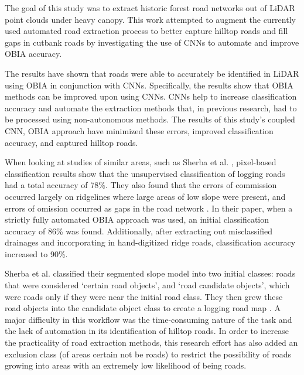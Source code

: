 \documentclass[remotesensing,article,accept,pdftex,moreauthors]{Definitions/mdpi}
\begin{document}
The goal of this study was to extract historic forest road networks out of LiDAR point clouds under heavy canopy. This work attempted to augment the currently used automated road extraction process to better capture hilltop roads and fill gaps in cutbank roads by investigating the use of CNNs to automate and improve OBIA accuracy.

The results have shown that roads were able to accurately be identified in LiDAR using OBIA in conjunction with CNNs. Specifically, the results show that OBIA methods can be improved upon using CNNs. CNNs help to increase classification accuracy and automate the extraction methods that, in previous research, had to be processed using non-autonomous methods. The results of this study’s coupled CNN, OBIA approach have minimized these errors, improved classification accuracy, and captured hilltop roads.

When looking at studies of similar areas, such as Sherba et al. \cite{sherba}, %
 pixel-based classification results show that the unsupervised classification of logging roads had a total accuracy of 78\%. They also found that the errors of commission occurred largely on ridgelines where large areas of low slope were present, and errors of omission occurred as gaps in the road network \cite{sherba}. In their paper, when a strictly fully automated OBIA approach was used, an initial classification accuracy of 86\% was found. Additionally, after extracting out misclassified drainages and incorporating in hand-digitized ridge roads, classification accuracy increased to 90\%.

Sherba et al. \cite{sherba} classified their segmented slope model into two initial classes: roads that were considered ‘certain road objects’, and ‘road candidate objects’, which were roads only if they were near the initial road class. They then grew these road objects into the candidate object class to create a logging road map \cite{sherba}. A major difficulty in this workflow was the time-consuming nature of the task and the lack of automation in its identification of hilltop roads. In order to increase the practicality of road extraction methods, this research effort has also added an exclusion class (of areas certain not be roads) to restrict the possibility of roads growing into areas with an extremely low likelihood of being roads.
\end{document}
